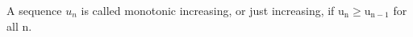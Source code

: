 A sequence $u_{n}$  is called monotonic increasing, or just increasing, if
$ \mathrm{u}_{\mathrm{n}} \geq \mathrm{u}_{\mathrm{n}-1} $ for all n.